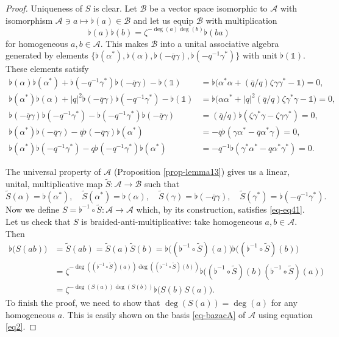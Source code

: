 \documentclass[12pt,reqno,a4paper]{amsart}
\theoremstyle{definition}
\newcommand{\comp}{\circ}
\newcommand{\I}{\mathds{1}}
\newcommand{\cA}{\mathscr{A}}
\newcommand{\cB}{\mathscr{B}}
\numberwithin{equation}{section}
\begin{document}
\begin{proof}
Uniqueness of $S$ is clear. Let $\cB$ be a vector space isomorphic to $\cA$ with isomorphism $\cA\ni a\mapsto\flat(a)\in \cB$ and let us equip $\cB$ with multiplication
\[
\flat(a)\flat(b)=
\zeta^{-\deg(a)\deg(b)}\flat(ba)
\]
for homogeneous $a,b\in\cA$. This makes $\cB$ into a unital associative algebra generated by elements $\bigl\{\flat(\alpha^*),\flat(\alpha),\flat(-\overline{q}\gamma),\flat(-q^{-1}\gamma^*)\bigr\}$ with unit $\flat(\I)$. These elements satisfy
\begin{align*}
\flat(\alpha)\flat(\alpha^*)+\flat(-q^{-1}\gamma^*)\flat(-\overline{q}\gamma)-\flat(\I)
&=\flat\bigl(\alpha^*\alpha +(\overline{q}/q)\zeta\gamma\gamma^*-\I\bigr)=0,\\
\flat(\alpha^*)\flat(\alpha)+|q|^2\flat(-\overline{q}\gamma)\flat(-q^{-1}\gamma^*)-\flat(\I)
&=\flat\bigl(\alpha\alpha^*+|q|^2(\overline{q}/q)\zeta\gamma^*\gamma-\I\bigr)=0,\\
\flat(-\overline{q}\gamma)\flat(-q^{-1} \gamma^*)-\flat(-q^{-1}\gamma^*)\flat(-\overline{q}\gamma)
&=(\overline{q}/q)\flat(\zeta\gamma^*\gamma-\zeta\gamma\gamma^*)=0,\\
\flat(\alpha^*)\flat(-\overline{q}\gamma)-\overline{q}\flat(-\overline{q}\gamma)\flat(\alpha^*)
&=-\overline{q}\flat(\gamma \alpha^*-\overline{q}\alpha^*\gamma)=0,\\
\flat(\alpha^*)\flat(-q^{-1}\gamma^*)-q\flat(-q^{-1}\gamma^*)\flat(\alpha^*)
&=-q^{-1}\flat(\gamma^*\alpha^*-q\alpha^*\gamma^*)=0.
\end{align*}

The universal property of $\cA$ (Proposition \ref{prop-lemma13}) gives us a linear, unital, multiplicative map $\tilde{S}\colon\cA\to\cB$ such that
\[
\tilde{S}(\alpha)=\flat(\alpha^*),\quad
\tilde{S}(\alpha^*)=\flat(\alpha),\quad
\tilde{S}(\gamma)=\flat(-\overline{q}\gamma),\quad
\tilde{S}(\gamma^*)=\flat(-q^{-1}\gamma^*).
\]
Now we define $S=\flat^{-1}\comp\tilde{S}\colon\cA\to\cA$ which, by its construction, satisfies \eqref{eq-eq41}. Let us check that $S$ is braided-anti-multiplicative: take homogeneous $a,b\in\cA$. Then
\begin{equation}\label{eq2}
\begin{aligned}
\flat\bigl(S(ab)\bigr)&=\tilde{S}(ab)=\tilde{S}(a)\tilde{S}(b)
=\flat\bigl((\flat^{-1}\comp\tilde{S})(a)\bigr)\flat\bigl((\flat^{-1}\comp\tilde{S})(b)\bigr)\\
&=\zeta^{-\deg((\flat^{-1}\comp\tilde{S})(a))\deg((\flat^{-1}\comp\tilde{S})(b))}
\flat\bigl((\flat^{-1}\comp\tilde{S})(b)(\flat^{-1}\comp\tilde{S})(a)\bigr)\\
&=\zeta^{-\deg(S(a))\deg(S(b))}
\flat\bigl(S(b)S(a)\bigr).
\end{aligned}
\end{equation}
To finish the proof, we need to show that $\deg(S(a))=\deg(a)$ for any homogeneous $a$. This is easily shown on the basis \eqref{eq-bazacA} of $\cA$ using equation \eqref{eq2}.
\end{proof}
\end{document}
